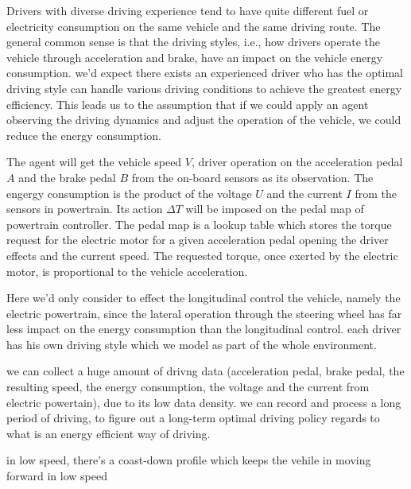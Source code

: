 \documentclass{article}
\begin{document}
Drivers with diverse driving experience tend to have quite different fuel or electricity consumption on the same vehicle and the same driving route. The general common sense is that the driving styles, i.e., how drivers operate the vehicle through acceleration and brake, have an impact on the vehicle energy consumption. we'd expect there exists an experienced driver who has the optimal driving style can handle various driving conditions to achieve the greatest energy efficiency. This leads us to the assumption that if we could apply an agent observing the driving dynamics and adjust the operation of the vehicle, we could reduce the energy consumption.

 The agent will get the vehicle speed $V$, driver operation on the acceleration pedal $A$ and the brake pedal $B$ from the on-board sensors as its observation. The engergy consumption is the product of the voltage $U$ and the current $I$ from the sensors in powertrain. Its action $\Delta T$ will be imposed on the pedal map of powertrain controller. The pedal map is a lookup table which stores the torque request for the electric motor for a given acceleration pedal opening the driver effects and the current speed. The requested torque, once exerted by the electric motor, is proportional to the vehicle acceleration.


Here we'd only consider to effect the longitudinal control the vehicle, namely the electric powertrain, since the lateral operation through the steering wheel has far less impact on the energy consumption than the longitudinal control.
each driver has his own driving style which we model as part of the whole environment.

we can collect a huge amount of drivng data (acceleration pedal, brake pedal, the resulting speed, the energy consumption, the voltage and the current from electric powertain), due to its low data density. we can record and process a long period of driving, to figure out a long-term optimal driving policy regards to what is an energy efficient way of driving.

in low speed, there's a coast-down profile which keeps the vehile in moving forward in low speed
\end{document}
